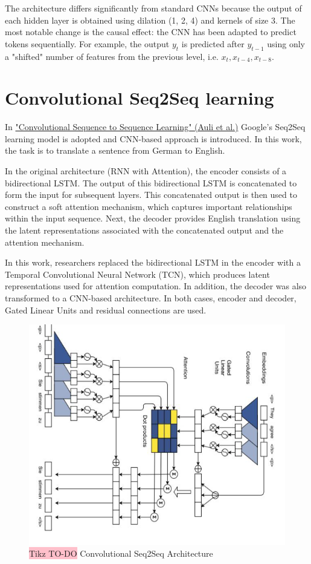 The architecture differs significantly from standard CNNs because the output of each hidden layer is obtained using dilation (1, 2, 4) and kernels of size 3. The most notable change is the causal effect: the CNN has been adapted to predict tokens sequentially. For example, the output $y_t$ is predicted after $y_{t-1}$ using only a "shifted" number of features from the previous level, i.e. $x_t, x_{t-4}, x_{t-8}$.


\section{Convolutional Seq2Seq learning}
In \href{https://arxiv.org/pdf/1705.03122}{"Convolutional Sequence to Sequence Learning" (Auli et al.)} Google's Seq2Seq learning model is adopted and CNN-based approach is introduced. In this work, the task is to translate a sentence from German to English.

In the original architecture (RNN with Attention), the encoder consists of a bidirectional LSTM. The output of this bidirectional LSTM is concatenated to form the input for subsequent layers. This concatenated output is then used to construct a soft attention mechanism, which captures important relationships within the input sequence. Next, the decoder provides English translation using the latent representations associated with the concatenated output and the attention mechanism.

In this work, researchers replaced the bidirectional LSTM in the encoder with a Temporal Convolutional Neural Network (TCN), which produces latent representations used for attention computation. In addition, the decoder was also transformed to a CNN-based architecture. In both cases, encoder and decoder, Gated Linear Units and residual connections are used.

\begin{figure}[!htbp]
    \centering
    \includegraphics[width=0.6\linewidth]{tikz/chapter8 - Convolutional Seq2Seq.png}
    \caption{{\color{red}\colorbox{pink}{Tikz TO-DO}} Convolutional Seq2Seq Architecture}
\end{figure}

